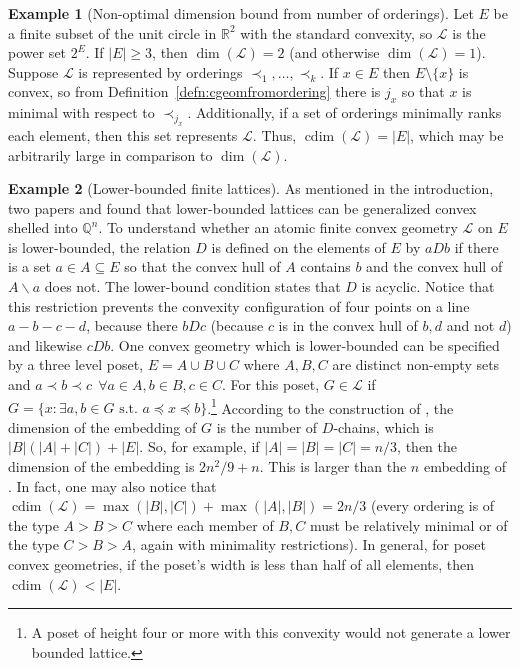 \documentclass[12pt]{elsarticle}
\theoremstyle{plain}
\theoremstyle{definition}
\newtheorem{example}{Example}
\newcommand{\cgeom}{\mathcal{L}}
\DeclareMathOperator{\cdim}{cdim}
\begin{document}
\begin{example}[Non-optimal dimension bound from number of orderings]
Let $E$ be a finite subset of the unit circle in $\mathbb{R}^2$ with the standard convexity, so $\cgeom$ is the power set $2^{E}$. If $|E| \geq 3$, then $\dim(\cgeom)=2$ (and otherwise $\dim(\cgeom)=1$).  Suppose $\cgeom$ is represented by orderings $\prec_1,\ldots,\prec_k$.  If $x\in E$ then $E\setminus\{x\}$ is convex, so from Definition~\ref{defn:cgeomfromordering} there is $j_{x}$ so that $x$ is minimal with respect to $\prec_{j_{x}}$. Additionally, if a set of orderings minimally ranks each element, then this set represents $\cgeom$. Thus, $\cdim(\cgeom)=|E|$, which may be arbitrarily large in comparison to $\dim(\cgeom)$. 
\end{example}

\begin{example}[Lower-bounded finite lattices]
As mentioned in the introduction, two papers \cite{A} and \cite{WS} found that lower-bounded lattices can be generalized convex shelled into $\mathbb{Q}^n$. To understand whether an atomic finite convex geometry $\cgeom$ on $E$ is lower-bounded, the relation $D$ is defined on the elements of $E$ by $a D b$ if there is a set $a \in A \subseteq E$ so that the convex hull of $A$ contains $b$ and the convex hull of $A\backslash a$ does not. The lower-bound condition states that $D$ is acyclic. Notice that this restriction prevents the convexity configuration of four points on a line $a-b-c-d$, because there $b D c$ (because $c$ is in the convex hull of $b,d$ and not $d$) and likewise $c D b$. One convex geometry which is lower-bounded can be specified by a three level poset, $E=A \cup B \cup C$ where $A,B,C$ are distinct non-empty sets and $a \prec b \prec c \ \ \forall a \in A, b \in B, c\in C$. For this poset, $G\in \cgeom$ if $G=\{x: \exists a,b \in G \text{ s.t. } a \preceq x \preceq b\}$.\footnote{A poset of height four or more with this convexity would not generate a lower bounded lattice.} According to the construction of \cite{WS}, the dimension of the embedding of $G$ is the number of $D$-chains, which is $|B|(|A|+|C|) + |E|$. So, for example, if $|A|=|B|=|C|=n/3$, then the dimension of the embedding is $2n^2/9+n$. This is larger than the $n$ embedding of \cite{KNO}. In fact, one may also notice that $\cdim(\cgeom)=\max(|B|,|C|)+\max(|A|,|B|)=2n/3$ (every ordering is of the type $A > B > C$ where each member of $B,C$ must be relatively minimal or of the type $C > B > A$, again with minimality restrictions). In general, for poset convex geometries, if the poset's width is less than half of all elements, then $\cdim(\cgeom) < |E|$.
\end{example}
\end{document}

